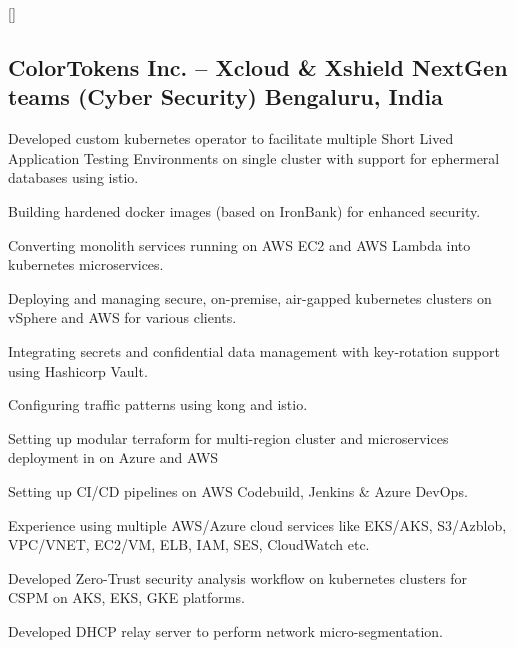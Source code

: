 \documentclass[letter,10pt]{article}
\begin{document}
\titlespacing*{\subsubsection}{0em}{0em}{0em}
\titleformat{\subsubsection}{\itshape}{}{0em}{}[]


\subsection{ColorTokens Inc. -- Xcloud \& Xshield NextGen teams (Cyber Security) \hfill Bengaluru, India}
\begin{zitemize}
    \item Developed custom kubernetes operator to facilitate multiple Short Lived Application Testing Environments on single cluster with support for ephermeral databases using istio.
    \item Building hardened docker images (based on IronBank) for enhanced security.
    \item Converting monolith services running on AWS EC2 and AWS Lambda into kubernetes microservices.
    \item Deploying and managing secure, on-premise, air-gapped kubernetes clusters on vSphere and AWS for various clients.
    \item Integrating secrets and confidential data management with key-rotation support using Hashicorp Vault.
    \item Configuring traffic patterns using kong and istio.
    \item Setting up modular terraform for multi-region cluster and microservices deployment in on Azure and AWS
    \item Setting up CI/CD pipelines on AWS Codebuild, Jenkins \& Azure DevOps.
    \item Experience using multiple AWS/Azure cloud services like EKS/AKS, S3/Azblob, VPC/VNET, EC2/VM, ELB, IAM, SES, CloudWatch etc.
    \item Developed Zero-Trust security analysis workflow on kubernetes clusters for CSPM on AKS, EKS, GKE platforms.
    \item Developed DHCP relay server to perform network micro-segmentation.
\end{zitemize}
\end{document}
